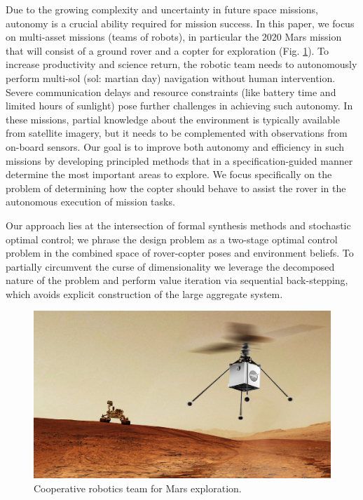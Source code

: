 \documentclass[conference]{IEEEtran}
\begin{document}
Due to the growing complexity and uncertainty in future space missions, autonomy is a crucial ability required for mission success. In this paper, we focus on multi-asset missions (teams of robots), in particular the 2020 Mars mission that will consist of a ground rover and a copter for exploration (Fig. \ref{fig:heli-rover}). To increase productivity and science return, the robotic team needs to autonomously perform multi-sol (sol: martian day) navigation without human intervention. Severe communication delays and resource constraints (like battery time and limited hours of sunlight) pose further challenges in achieving such autonomy. In these missions, partial knowledge about the environment is typically available from satellite imagery, but it needs to be complemented with observations from on-board sensors. Our goal is to improve both autonomy and efficiency in such missions by developing principled methods that in a specification-guided manner determine the most important areas to explore. We focus specifically on the problem of determining how the copter should behave to assist the rover in the autonomous execution of mission tasks.

Our approach lies at the intersection of formal synthesis methods and stochastic optimal control; we phrase the design %
problem as a two-stage optimal control problem in the combined space of rover-copter poses and environment beliefs. To partially circumvent the curse of dimensionality we leverage the decomposed nature of the problem and perform value iteration via sequential back-stepping, which avoids explicit construction of the large aggregate system.
\begin{figure}
  \begin{center}
    \includegraphics[width=0.8\columnwidth]{2figs/heli-rover.png}
  \end{center}
  \caption{Cooperative robotics team for Mars exploration.}
  \label{fig:heli-rover}
\end{figure}
\end{document}
